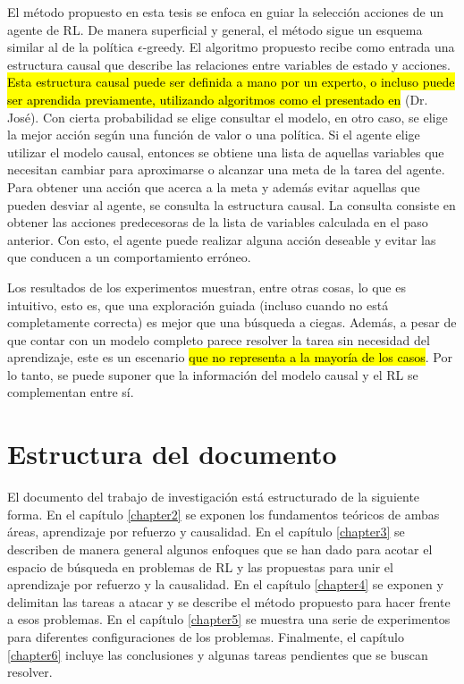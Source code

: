 El método propuesto en esta tesis se enfoca en guiar la
selección acciones de un agente de RL. De manera superficial y general, el método sigue un esquema similar al de la política $\epsilon$-greedy.
El algoritmo propuesto recibe como entrada una estructura causal que describe las relaciones entre variables de estado y acciones.
\hl{Esta estructura causal puede ser definida a mano por un experto,
o incluso puede ser aprendida previamente, utilizando algoritmos como
el presentado en} \cite{gonzalezsoto2020causal} (Dr. José).
Con cierta probabilidad se elige consultar el modelo, en otro caso, se elige la mejor acción según una función de valor o una política. 
Si el agente elige utilizar el modelo causal, entonces se obtiene una lista de aquellas variables que necesitan cambiar para aproximarse o alcanzar una meta de la tarea del agente. Para obtener una acción que acerca a la meta y además evitar aquellas que pueden desviar al agente, se consulta la estructura causal. La consulta consiste en obtener las acciones predecesoras de la lista de variables calculada en el paso anterior. Con esto, 
el agente puede realizar alguna acción deseable y evitar las que conducen a un comportamiento erróneo.

Los resultados de los experimentos muestran, entre otras cosas, lo que es intuitivo, esto es, que una exploración guiada (incluso cuando no está completamente correcta) es mejor que una búsqueda a ciegas. Además, a pesar de que contar con un modelo completo parece resolver la tarea sin necesidad del aprendizaje, este es un escenario \hl{que no representa a la mayoría de los casos}. Por lo tanto, se puede suponer que la información del modelo causal y el RL se complementan entre sí.

\section{Estructura del documento}

El documento del trabajo de investigación está estructurado de la 
siguiente forma.
En el capítulo \ref{chapter2} se exponen los fundamentos teóricos de ambas áreas, aprendizaje por refuerzo y causalidad.
En el capítulo \ref{chapter3} se describen de manera general algunos enfoques
que se han dado para acotar el espacio de búsqueda en problemas
de RL y las propuestas para unir el aprendizaje por refuerzo y
la causalidad. En el capítulo \ref{chapter4} se exponen y
delimitan las tareas a atacar y se describe el método propuesto para hacer frente a esos problemas. En el capítulo \ref{chapter5} se muestra una serie de experimentos
para diferentes configuraciones de los problemas. Finalmente,
el capítulo \ref{chapter6} incluye las conclusiones y algunas tareas pendientes que se buscan resolver.
